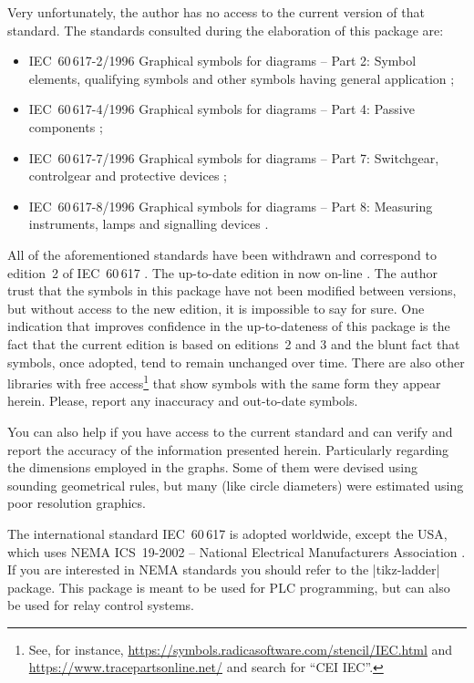 \documentclass[a4paper]{ltxdoc}
\begin{document}
Very unfortunately, the author has no access to the current version of that standard. The standards consulted during the elaboration of this package are:
\begin{itemize}
\item IEC~60\,617-2/1996 Graphical symbols for diagrams -- Part 2: Symbol elements, qualifying symbols and other symbols having general application \cite{60617-2};
\item IEC~60\,617-4/1996 Graphical symbols for diagrams -- Part 4: Passive components \cite{60617-4};
\item IEC~60\,617-7/1996 Graphical symbols for diagrams -- Part 7: Switchgear, controlgear and protective devices \cite{60617-7};
\item IEC~60\,617-8/1996 Graphical symbols for diagrams -- Part 8: Measuring instruments, lamps and signalling devices \cite{60617-8}.
\end{itemize}
All of the aforementioned standards have been withdrawn and correspond to edition~2 of IEC~60\,617 \cite{60617-2,60617-4,60617-7,60617-8}. The up-to-date edition in now on-line \cite{60617}. The author trust that the symbols in this package have not been modified between versions, but without access to the new edition, it is impossible to say for sure. One indication that improves confidence in the up-to-dateness of this package is the fact that the current edition is based on editions~2 and 3 and the blunt fact that symbols, once adopted, tend to remain unchanged over time. There are also other libraries with free access\footnote{See, for instance, \url{https://symbols.radicasoftware.com/stencil/IEC.html} and \url{https://www.tracepartsonline.net/} and search for ``CEI IEC''.} that show symbols with the same form they appear herein. Please, report any inaccuracy and out-to-date symbols.

You can also help if you have access to the current standard and can verify and report the accuracy of the information presented herein. Particularly regarding the dimensions employed in the graphs. Some of them were devised using sounding geometrical rules, but many (like circle diameters) were estimated using poor resolution graphics. 

The international standard IEC~60\,617 is adopted worldwide, except the USA, which uses NEMA ICS~19-2002  -- National Electrical Manufacturers Association \cite{NEMA}. If you are interested in NEMA standards you should refer to the |tikz-ladder| package. This package is meant to be used for PLC programming, but can also be used for relay control systems.
\end{document}
